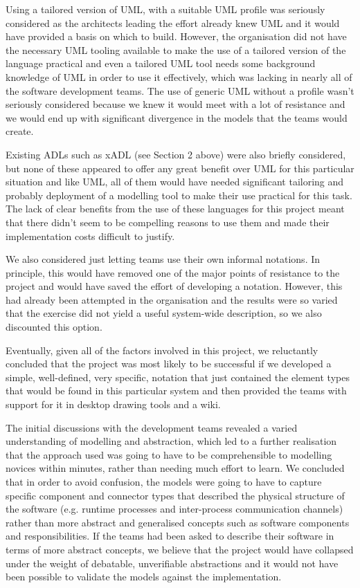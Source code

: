   Using a tailored version of UML, with a suitable UML profile was seriously considered as the architects leading the effort already knew UML and it would have provided a basis on which to build.  However, the organisation did not have the necessary UML tooling available to make the use of a tailored version of the language practical and even a tailored UML tool needs some background knowledge of UML in order to use it effectively, which was lacking in nearly all of the software development teams.  The use of generic UML without a profile wasn't seriously considered because we knew it would meet with a lot of resistance and we would end up with significant divergence in the models that the teams would create.

  Existing ADLs such as xADL (see Section 2 above) were also briefly considered, but none of these appeared to offer any great benefit over UML for this particular situation and like UML, all of them would have needed significant tailoring and probably deployment of a modelling tool to make their use practical for this task.  The lack of clear benefits from the use of these languages for this project meant that there didn't seem to be compelling reasons to use them and made their implementation costs difficult to justify.

  We also considered just letting teams use their own informal notations.  In principle, this would have removed one of the major points of resistance to the project and would have saved the effort of developing a notation.  However, this had already been attempted in the organisation and the results were so varied that the exercise did not yield a useful system-wide description, so we also discounted this option.

  Eventually, given all of the factors involved in this project, we reluctantly concluded that the project was most likely to be successful if we developed a simple, well-defined, very specific, notation that just contained the element types that would be found in this particular system and then provided the teams with support for it in desktop drawing tools and a wiki.

  The initial discussions with the development teams revealed a varied understanding of modelling and abstraction, which led to a further realisation that the approach used was going to have to be comprehensible to modelling novices within minutes, rather than needing much effort to learn.  We concluded that in order to avoid confusion, the models were going to have to capture specific component and connector types that described the physical structure of the software (e.g. runtime processes and inter-process communication channels) rather than more abstract and generalised concepts such as software components and responsibilities.  If the teams had been asked to describe their software in terms of more abstract concepts, we believe that the project would have collapsed under the weight of debatable, unverifiable abstractions and it would not have been possible to validate the models against the implementation.

